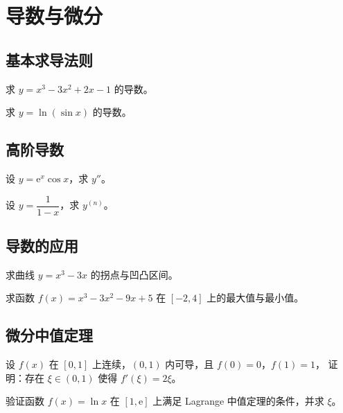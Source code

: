 \documentclass{kazetex}
\begin{document}
\section{导数与微分}

\subsection{基本求导法则}

\begin{problem}
  求 $y=x^3-3x^2+2x-1$ 的导数。
\end{problem}

\begin{problem}
  求 $y=\ln(\sin x)$ 的导数。
\end{problem}

\subsection{高阶导数}

\begin{problem}
  设 $y=\mathrm{e}^{x}\cos x$，求 $y''$。
\end{problem}

\begin{problem}
  设 $y=\dfrac{1}{1-x}$，求 $y^{(n)}$。
\end{problem}

\subsection{导数的应用}

\begin{problem}
  求曲线 $y=x^3-3x$ 的拐点与凹凸区间。
\end{problem}

\begin{problem}
  求函数 $f(x)=x^3-3x^2-9x+5$ 在 $[-2,4]$ 上的最大值与最小值。
\end{problem}

\subsection{微分中值定理}

\begin{problem}
  设 $f(x)$ 在 $[0,1]$ 上连续，$(0,1)$ 内可导，且 $f(0)=0$，$f(1)=1$，
  证明：存在 $\xi\in(0,1)$ 使得 $f'(\xi)=2\xi$。
\end{problem}

\begin{problem}
  验证函数 $f(x)=\ln x$ 在 $[1,\mathrm{e}]$ 上满足 Lagrange 中值定理的条件，并求 $\xi$。
\end{problem}
\end{document}
